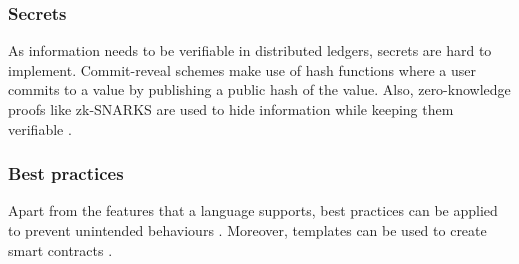 \subsubsection{Secrets}
As information needs to be verifiable in distributed ledgers, secrets are hard to implement. Commit-reveal schemes make use of hash functions where a user commits to a value by publishing a public hash of the value. Also, zero-knowledge proofs like zk-SNARKS are used to hide information while keeping them verifiable \cite{Sasson2014}.

\subsubsection{Best practices}
Apart from the features that a language supports, best practices can be applied to prevent unintended behaviours \cite{Wohrer2018,ConsenSys2018Security}.
Moreover, templates can be used to create smart contracts \cite{Clack2016}.
